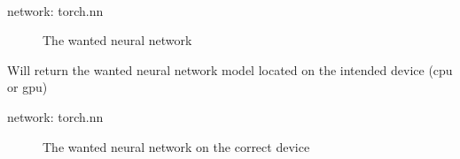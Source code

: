\documentclass[letterpaper,10pt,english]{sphinxmanual}
\begin{document}
\begin{fulllineitems}
\begin{fulllineitems}
\begin{description}
\end{description}

\end{fulllineitems}


\begin{fulllineitems}
\label{\detokenize{MultiAgentMarketRL:network_models.NetworkSetting.define_network}}~\begin{description}
\item[{network: torch.nn}] \leavevmode
\sphinxAtStartPar
The wanted neural network

\end{description}

\end{fulllineitems}


\begin{fulllineitems}
\label{\detokenize{MultiAgentMarketRL:network_models.NetworkSetting.get_network}}
\sphinxAtStartPar
Will return the wanted neural network model located on the intended device (cpu or gpu)
\begin{description}
\item[{network: torch.nn}] \leavevmode
\sphinxAtStartPar
The wanted neural network on the correct device

\end{description}

\end{fulllineitems}


\end{fulllineitems}

\end{document}
